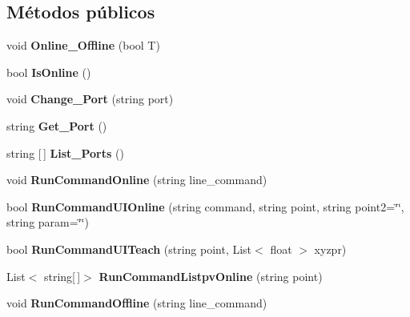 \subsection*{Métodos públicos}
\begin{DoxyCompactItemize}
\item 
\mbox{\label{class_controller_ad823d3d6ceeb7aec70100f43d2e94748}} 
void {\bfseries Online\+\_\+\+Offline} (bool T)
\item 
\mbox{\label{class_controller_afc8517ea3abd9acb92173b55342b320a}} 
bool {\bfseries Is\+Online} ()
\item 
\mbox{\label{class_controller_a9d890757158c307d9e9d1915b03b5928}} 
void {\bfseries Change\+\_\+\+Port} (string port)
\item 
\mbox{\label{class_controller_a8a4b22a9b00f39da6e6c2dc063066460}} 
string {\bfseries Get\+\_\+\+Port} ()
\item 
\mbox{\label{class_controller_a7cd4400bd0fe69494c14002b6b2fa649}} 
string \mbox{[}$\,$\mbox{]} {\bfseries List\+\_\+\+Ports} ()
\item 
\mbox{\label{class_controller_a92811ce0f1bce922136d254730a1be8f}} 
void {\bfseries Run\+Command\+Online} (string line\+\_\+command)
\item 
\mbox{\label{class_controller_ae08a706bf80dc97741a7eb65a3ece6d3}} 
bool {\bfseries Run\+Command\+U\+I\+Online} (string command, string point, string point2=\char`\"{}\char`\"{}, string param=\char`\"{}\char`\"{})
\item 
\mbox{\label{class_controller_abeae24ba81e6f83fd3c2502981143212}} 
bool {\bfseries Run\+Command\+U\+I\+Teach} (string point, List$<$ float $>$ xyzpr)
\item 
\mbox{\label{class_controller_a65282850ef11298e5acd69b9ac61cdca}} 
List$<$ string\mbox{[}$\,$\mbox{]}$>$ {\bfseries Run\+Command\+Listpv\+Online} (string point)
\item 
\mbox{\label{class_controller_aa579bf7f25f6004e8e0e25a2dd044315}} 
void {\bfseries Run\+Command\+Offline} (string line\+\_\+command)
\end{DoxyCompactItemize}
